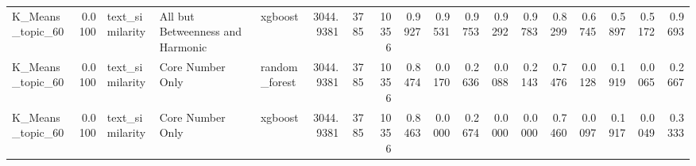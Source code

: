 \begin{tabular}{lrlllrrrrrrrrrrrrr}
K_Means_topic_60 & 0.0100 & text_similarity & All but Betweenness and Harmonic & xgboost & 3044.9381 & 3785 & 10356 & 0.9927 & 0.9531 & 0.9753 & 0.9292 & 0.9783 & 0.8299 & 0.6745 & 0.5897 & 0.5172 & 0.9693 \\
K_Means_topic_60 & 0.0100 & text_similarity & Core Number Only & random_forest & 3044.9381 & 3785 & 10356 & 0.8474 & 0.0170 & 0.2636 & 0.0088 & 0.2143 & 0.7476 & 0.0128 & 0.1919 & 0.0065 & 0.2667 \\
K_Means_topic_60 & 0.0100 & text_similarity & Core Number Only & xgboost & 3044.9381 & 3785 & 10356 & 0.8463 & 0.0000 & 0.2674 & 0.0000 & 0.0000 & 0.7460 & 0.0097 & 0.1917 & 0.0049 & 0.3333 \\
\bottomrule
\end{tabular}
